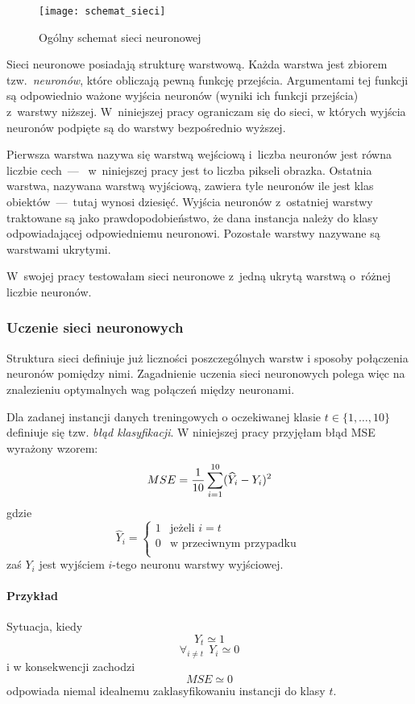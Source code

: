 \documentclass[12pt]{article}
\begin{document}
\begin{figure}[H]
 \centering
 \texttt{[image: schemat\_sieci]}
 \caption{Ogólny schemat sieci neuronowej}
\label{fig:przyrost pca}
\end{figure}

Sieci neuronowe posiadają strukturę warstwową. Każda warstwa jest zbiorem tzw.~\emph{neuronów}, 
które obliczają pewną funkcję przejścia. Argumentami tej funkcji są odpowiednio ważone wyjścia neuronów 
(wyniki ich funkcji przejścia) z~warstwy niższej. W~niniejszej pracy ograniczam się do sieci, 
w których wyjścia neuronów podpięte są do warstwy bezpośrednio wyższej. 

Pierwsza warstwa nazywa się warstwą wejściową i~liczba neuronów jest równa liczbie cech~---~
w~niniejszej pracy jest to liczba pikseli obrazka. Ostatnia warstwa, nazywana warstwą wyjściową, 
zawiera tyle neuronów ile jest klas obiektów~---~tutaj wynosi dziesięć. Wyjścia neuronów z~ostatniej warstwy
traktowane są jako prawdopodobieństwo, że dana instancja należy do klasy odpowiadającej odpowiedniemu 
neuronowi. Pozostałe warstwy nazywane są warstwami ukrytymi.

W~swojej pracy testowałam sieci neuronowe z~jedną ukrytą warstwą o~różnej liczbie neuronów.

\subsubsection{Uczenie sieci neuronowych}
Struktura sieci definiuje już liczności poszczególnych warstw i sposoby połączenia neuronów pomiędzy nimi.
Zagadnienie uczenia sieci neuronowych polega więc na znalezieniu optymalnych wag połączeń między neuronami.

Dla zadanej instancji danych treningowych o oczekiwanej klasie $t \in \{1, \ldots, 10\}$ 
definiuje się tzw. \emph{błąd klasyfikacji}. W niniejszej pracy przyjęłam błąd MSE wyrażony wzorem:
\[
 MSE = {1 \over 10} \sum_{i=1}^{10} (\widehat{Y}_i - Y_i)^2
\]
gdzie
\[
\widehat{Y}_i = \left\{ \begin{array}{ll}
	1 & \textrm{jeżeli } i = t \\
	0 & \textrm{w przeciwnym przypadku}\\
\end{array} \right.\
\]
zaś $Y_i$ jest wyjściem $i$-tego neuronu warstwy wyjściowej. \\
\paragraph{Przykład} Sytuacja, kiedy
\[
    Y_t \simeq 1
\]
\[
	\forall_{i \neq t}\ \ Y_i \simeq 0
\]
i w konsekwencji zachodzi 
\[
    MSE \simeq 0
\]
odpowiada niemal idealnemu zaklasyfikowaniu instancji do klasy $t$.
\end{document}
